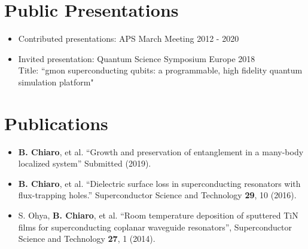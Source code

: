 \documentclass[letterpaper,11pt]{article}
\newcommand{\resumeItem}[2]{
\item \small{#1{#2 \vspace{-2pt} }
}
}
\newcommand{\resumeSubItem}[2]{\resumeItem{#1}{#2}\vspace{-4pt}}
\newcommand{\resumeSubHeadingListStart}{\begin{itemize}[leftmargin=*]}
\newcommand{\resumeSubHeadingListEnd}{\end{itemize}}
\begin{document}
\section{Public Presentations}
\resumeSubHeadingListStart
\resumeSubItem{Contributed presentations:  APS March Meeting 2012 - 2020}{}
\resumeSubItem{Invited presentation:  Quantum Science Symposium Europe 2018 \\}
{Title:  ``gmon superconducting qubits: a programmable, high fidelity quantum simulation platform"}
\resumeSubHeadingListEnd

\section{Publications}
\resumeSubHeadingListStart
\resumeSubItem{\textbf{B. Chiaro}, et al.  “Growth and preservation of entanglement in a many-body localized system” Submitted (2019).}{}
\resumeSubItem{\textbf{B. Chiaro}, et al.  “Dielectric surface loss in superconducting resonators with flux-trapping holes.” Superconductor Science and Technology \textbf{29}, 10 (2016).}{}
\resumeSubItem{S. Ohya, \textbf{B. Chiaro}, et al. “Room temperature deposition of sputtered TiN films for superconducting coplanar waveguide resonators”, Superconductor Science and Technology \textbf{27}, 1 (2014).}{}
\resumeSubHeadingListEnd


\begin{comment}
\section{Technical Skills}
\resumeSubHeadingListStart
\item{
\textbf{Scientific programming}{:  python, numpy, scipy, pandas, matplotlib, git \\
- data acquisition, analysis, and presentation. \\
- Numerical simulations of quantum dynamics}
}
\item{\textbf{Electronic test and measurement} }
\item{\textbf{Materials science and device fabrication}, Reactive UHV sputter deposition, Inductively coupled plasma etching, optical lithography}
\item{\textbf{Cryogenics}: Adiabatic demagnetization refridgerator, Dilution refridgerator}
\resumeSubHeadingListEnd
\end{comment}
\end{document}
